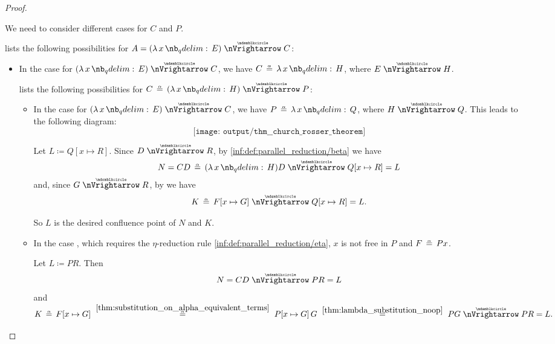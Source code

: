 \begin{proof}
\begin{itemize}
\begin{itemize}
      We need to consider different cases for \( C \) and \( P \).

       lists the following possibilities for \( A = (\qabs x E) \ppred C \):
      \begin{itemize}
        \item In the case  for \( (\qabs x E) \ppred C \), we have \( C \aequiv \qabs x H \), where \( E \ppred H \).

         lists the following possibilities for \( C \aequiv (\qabs x H) \ppred P \):
        \begin{itemize}
          \item In the case  for \( (\qabs x E) \ppred C \), we have \( P \aequiv \qabs x Q \), where \( H \ppred Q \). This leads to the following diagram:
          \begin{equation*}
            \texttt{[image: output/thm\_\_church\_rosser\_theorem]}
          \end{equation*}

          Let \( L \coloneqq Q[x \mapsto R] \). Since \( D \ppred R \), by \ref{inf:def:parallel_reduction/beta} we have
          \begin{equation*}
            N = CD \aequiv (\qabs x H) D \ppred Q[x \mapsto R] = L
          \end{equation*}
          and, since \( G \ppred R \), by  we have
          \begin{equation*}
            K \aequiv F[x \mapsto G] \ppred Q[x \mapsto R] = L.
          \end{equation*}

          So \( L \) is the desired confluence point of \( N \) and \( K \).

          \item In the case , which requires the \( \eta \)-reduction rule \ref{inf:def:parallel_reduction/eta}, \( x \) is not free in \( P \) and \( F \aequiv Px \).

          Let \( L \coloneqq PR \). Then
          \begin{equation*}
            N
            =
            CD
            \ppred
            PR
            =
            L
          \end{equation*}
          and
          \begin{equation*}
            K
            \aequiv
            F[x \mapsto G]
            \reloset {\ref{thm:substitution_on_alpha_equivalent_terms}} \aequiv
            P[x \mapsto G] \thinspace G
            \reloset {\ref{thm:lambda_substitution_noop}} =
            PG
            \ppred
            PR
            =
            L.
          \end{equation*}
        \end{itemize}
      \end{itemize}
    \end{itemize}


\end{itemize}
\end{proof}
